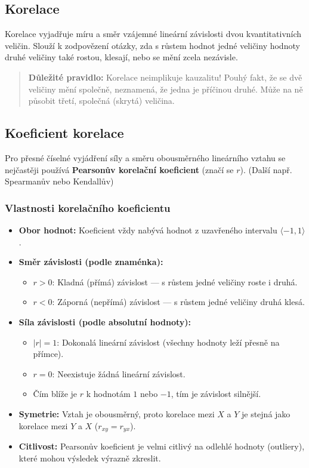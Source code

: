 \subsection{Korelace}
Korelace vyjadřuje míru a směr vzájemné lineární závislosti dvou kvantitativních veličin. Slouží k zodpovězení otázky, zda s růstem hodnot jedné veličiny hodnoty druhé veličiny také rostou, klesají, nebo se mění zcela nezávisle. 

\begin{quote}
    \textbf{Důležité pravidlo:} Korelace neimplikuje kauzalitu! Pouhý fakt, že se dvě veličiny mění společně, neznamená, že jedna je příčinou druhé. Může na ně působit třetí, společná (skrytá) veličina.
\end{quote}

\subsection{Koeficient korelace}
Pro přesné číselné vyjádření síly a směru obousměrného lineárního vztahu se nejčastěji používá \textbf{Pearsonův korelační koeficient} (značí se $r$). (Další např. Spearmanův nebo Kendallův)

\subsubsection*{Vlastnosti korelačního koeficientu}
\begin{itemize}
    \item \textbf{Obor hodnot:} Koeficient vždy nabývá hodnot z uzavřeného intervalu $\langle -1, 1 \rangle$.
    \item \textbf{Směr závislosti (podle znaménka):}
    \begin{itemize}
        \item $r > 0$: Kladná (přímá) závislost — s růstem jedné veličiny roste i druhá.
        \item $r < 0$: Záporná (nepřímá) závislost — s růstem jedné veličiny druhá klesá.
    \end{itemize}
    \item \textbf{Síla závislosti (podle absolutní hodnoty):}
    \begin{itemize}
        \item $|r| = 1$: Dokonalá lineární závislost (všechny hodnoty leží přesně na přímce).
        \item $r = 0$: Neexistuje žádná lineární závislost.
        \item Čím blíže je $r$ k hodnotám $1$ nebo $-1$, tím je závislost silnější.
    \end{itemize}
    \item \textbf{Symetrie:} Vztah je obousměrný, proto korelace mezi $X$ a $Y$ je stejná jako korelace mezi $Y$ a $X$ ($r_{xy} = r_{yx}$).
    \item \textbf{Citlivost:} Pearsonův koeficient je velmi citlivý na odlehlé hodnoty (outliery), které mohou výsledek výrazně zkreslit.
\end{itemize}


